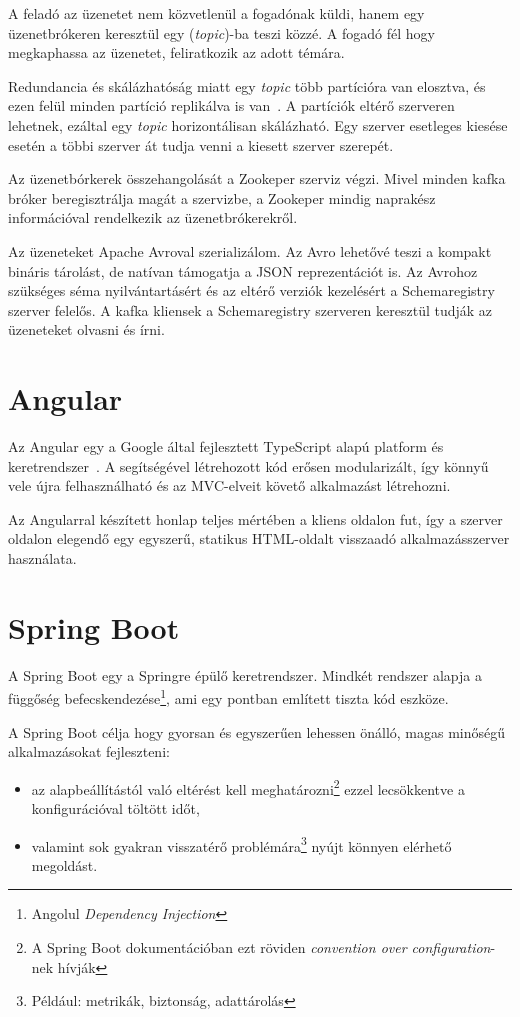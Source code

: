 A feladó az üzenetet nem közvetlenül a fogadónak küldi, hanem egy üzenetbrókeren keresztül egy (\textit{topic})-ba teszi közzé. A fogadó fél hogy megkaphassa az üzenetet, feliratkozik az adott témára. 

Redundancia és skálázhatóság miatt egy \textit{topic} több partícióra van elosztva, és ezen felül minden partíció replikálva is van~\cite{OReally_Kafka_Internals}. A partíciók eltérő szerveren lehetnek, ezáltal egy \textit{topic} horizontálisan skálázható. Egy szerver esetleges kiesése esetén a többi szerver át tudja venni a kiesett szerver szerepét.

Az üzenetbórkerek összehangolását a Zookeper szerviz végzi. Mivel minden kafka bróker beregisztrálja magát a szervizbe, a Zookeper mindig naprakész információval rendelkezik az üzenetbrókerekről.

Az üzeneteket Apache Avroval szerializálom. Az Avro lehetővé teszi a kompakt bináris tárolást, de natívan támogatja a JSON reprezentációt is. Az Avrohoz szükséges séma nyilvántartásért és az eltérő verziók kezelésért a Schemaregistry szerver felelős. A kafka kliensek a Schemaregistry szerveren keresztül tudják az üzeneteket olvasni és írni. 



\section{Angular}\label{sec:angular}
Az \foreignlanguage{british}{Angular} egy a \foreignlanguage{british}{Google} által fejlesztett \foreignlanguage{british}{TypeScript} alapú platform és	keretrendszer~\cite{angular_docs}. A segítségével létrehozott kód erősen modularizált, így könnyű vele újra felhasználható és az MVC-elveit követő alkalmazást létrehozni.

Az Angularral készített honlap teljes mértében a kliens oldalon fut, így a szerver oldalon elegendő egy egyszerű, statikus HTML-oldalt visszaadó alkalmazásszerver használata.


\section{Spring Boot}\label{sec:spring_boot}
A \foreignlanguage{british}{Spring Boot} egy a Springre épülő keretrendszer. Mindkét rendszer alapja a függőség befecskendezése\footnote{Angolul \foreignlanguage{british}{\textit{Dependency Injection}}}, ami egy  pontban említett tiszta kód \cite{clean_code_chapter_systems} eszköze.

A Spring Boot \cite{introducing_spring_boot} célja hogy gyorsan és egyszerűen lehessen önálló, magas minőségű alkalmazásokat fejleszteni:
\begin{itemize}
	\item az alapbeállítástól való eltérést kell meghatározni\footnote{A Spring Boot dokumentációban ezt röviden \textit{convention over configuration}-nek hívják} ezzel lecsökkentve a konfigurációval töltött időt,
	\item valamint sok gyakran visszatérő problémára\footnote{Például: metrikák, biztonság, adattárolás} nyújt könnyen elérhető megoldást.
\end{itemize}



